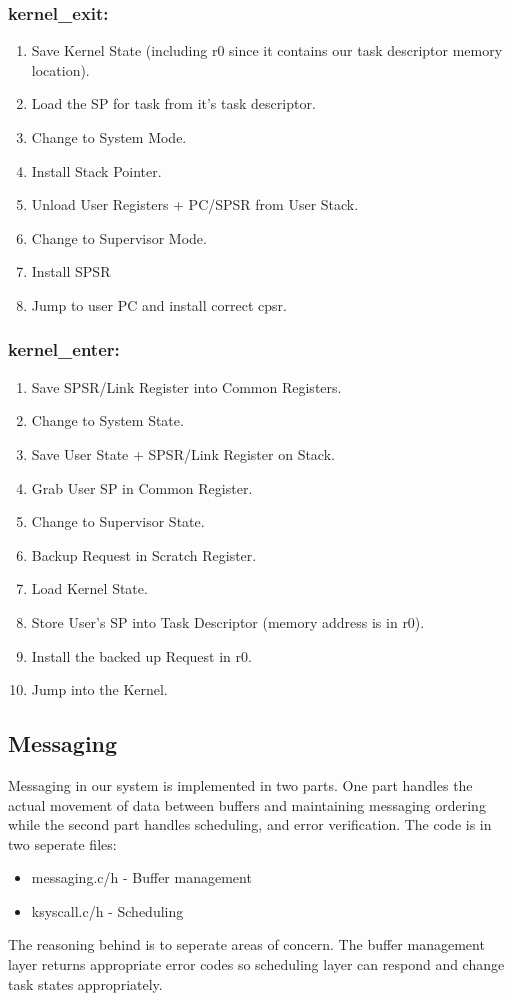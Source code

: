 \documentclass{article}
\begin{document}
\subsubsection{kernel\_exit:}
\begin{enumerate}
    \item Save Kernel State (including r0 since it contains our task descriptor memory location).
    \item Load the SP for task from it's task descriptor.
    \item Change to System Mode. 
    \item Install Stack Pointer.
    \item Unload User Registers + PC/SPSR from User Stack.
    \item Change to Supervisor Mode.
    \item Install SPSR
    \item Jump to user PC and install correct cpsr.
\end{enumerate}

\subsubsection{kernel\_enter:}
\begin{enumerate}
   \item Save SPSR/Link Register into Common Registers.
   \item Change to System State.
   \item Save User State + SPSR/Link Register on Stack.
   \item Grab User SP in Common Register.
   \item Change to Supervisor State.
   \item Backup Request in Scratch Register.
   \item Load Kernel State.
   \item Store User's SP into Task Descriptor (memory address is in r0).
   \item Install the backed up Request in r0.
   \item Jump into the Kernel.
\end{enumerate}

\subsection{Messaging}

Messaging in our system is implemented in two parts. One part handles the actual movement of data between buffers and maintaining messaging ordering while the second part handles scheduling, and error verification. The code is in two seperate files:
\begin{itemize}
    \item messaging.{c/h} - Buffer management
    \item ksyscall.{c/h} - Scheduling
\end{itemize}
The reasoning behind is to seperate areas of concern. The buffer management layer returns appropriate error codes so scheduling layer can respond and change task states appropriately.
\end{document}
